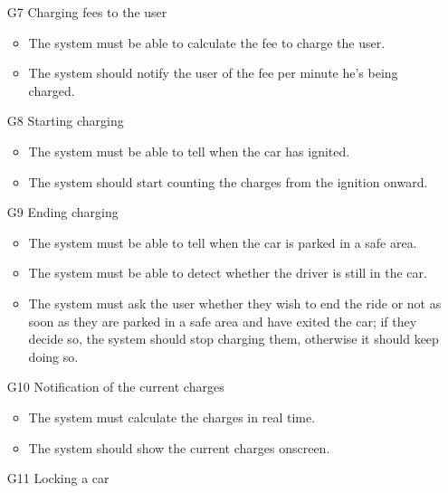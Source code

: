 \begin{itemize}
	\item [G7] Charging fees to the user %
		\begin{itemize}
			\item The system must be able to calculate the fee to charge the user.
			\item The system should notify the user of the fee per minute he's being charged.
		\end{itemize}
	\item [G8] Starting charging %
		\begin{itemize}
			\item The system must be able to tell when the car has ignited. 
			\item The system should start counting the charges from the ignition onward. %
		\end{itemize}
	\item [G9] Ending charging %
		\begin{itemize}
			\item The system must be able to tell when the car is parked in a safe area.
			\item The system must be able to detect whether the driver is still in the car.
			\item The system must ask the user whether they wish to end the ride or not as soon as they are parked in a safe area and have exited the car; if they decide so, the system should stop charging them, otherwise it should keep doing so. 
		\end{itemize}
	\item [G10] Notification of the current charges %
		\begin{itemize}
			\item The system must calculate the charges in real time. %
			\item The system should show the current charges onscreen. 
		\end{itemize}
	\item [G11] Locking a car %
		\begin{itemize}

\end{itemize}
\end{itemize}
